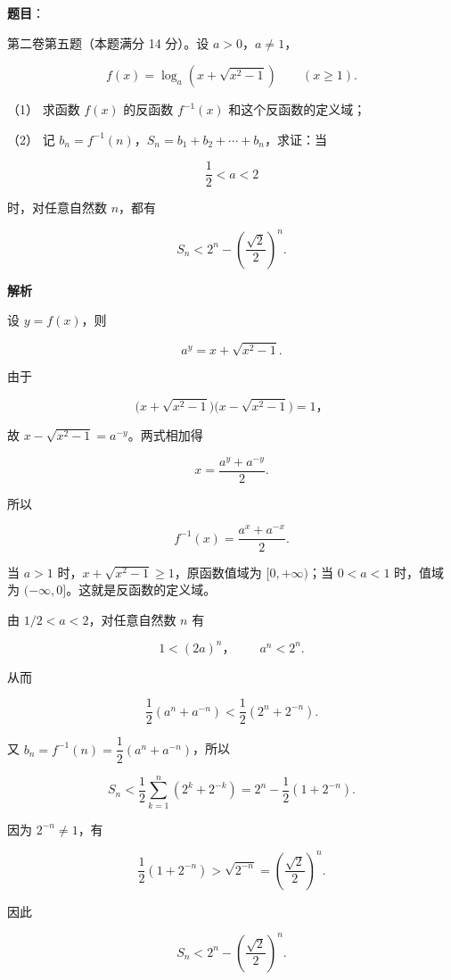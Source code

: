 \begin{answer}

\textbf{题目}：

第二卷第五题（本题满分 14 分）。设 $a>0$，$a\ne1$，

\nopagebreak[4]
\[
f(x)=\log_a\left(x+\sqrt{x^2-1}\right)\qquad(x\ge1).
\]

（1） 求函数 $f(x)$ 的反函数 $f^{-1}(x)$ 和这个反函数的定义域；

（2） 记 $b_n=f^{-1}(n)$，$S_n=b_1+b_2+\cdots+b_n$，求证：当

\nopagebreak[4]
\[
\frac12<a<2
\]

时，对任意自然数 $n$，都有

\nopagebreak[4]
\[
S_n<2^n-\left(\frac{\sqrt2}{2}\right)^n.
\]

\textbf{解析}


设 $y=f(x)$，则

\nopagebreak[4]
\[
a^y=x+\sqrt{x^2-1}.
\]

由于

\nopagebreak[4]
\[
\bigl(x+\sqrt{x^2-1}\bigr)\bigl(x-\sqrt{x^2-1}\bigr)=1\text{，}
\]

故 $x-\sqrt{x^2-1}=a^{-y}$。两式相加得

\nopagebreak[4]
\[
x=\frac{a^y+a^{-y}}2.
\]

所以

\nopagebreak[4]
\[
f^{-1}(x)=\frac{a^x+a^{-x}}2.
\]

当 $a>1$ 时，$x+\sqrt{x^2-1}\ge1$，原函数值域为 $[0,+\infty)$；当 $0<a<1$ 时，值域为 $(-\infty,0]$。这就是反函数的定义域。


由 $1/2<a<2$，对任意自然数 $n$ 有

\nopagebreak[4]
\[
1<(2a)^n\text{，}
\qquad a^n<2^n.
\]

从而

\nopagebreak[4]
\[
\frac12(a^n+a^{-n})<\frac12(2^n+2^{-n}).
\]

又 $b_n=f^{-1}(n)=\dfrac12(a^n+a^{-n})$，所以

\nopagebreak[4]
\[
S_n<\frac12\sum_{k=1}^n(2^k+2^{-k})
=2^n-\frac12(1+2^{-n}).
\]

因为 $2^{-n}\ne1$，有

\nopagebreak[4]
\[
\frac12(1+2^{-n})>\sqrt{2^{-n}}=\left(\frac{\sqrt2}{2}\right)^n.
\]

因此

\nopagebreak[4]
\[
S_n<2^n-\left(\frac{\sqrt2}{2}\right)^n.
\]



\end{answer}
